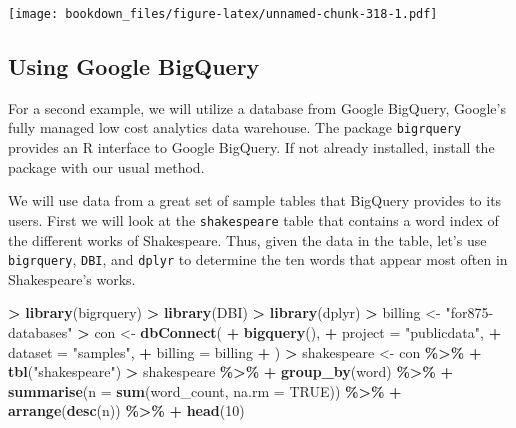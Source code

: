 \documentclass[
]{krantz}
\makeatletter
\newenvironment{Shaded}{\begin{snugshade}}{\end{snugshade}}
\newcommand{\DataTypeTok}[1]{\textcolor[rgb]{0.27,0.27,0.27}{#1}}
\newcommand{\DecValTok}[1]{\textcolor[rgb]{0.06,0.06,0.06}{#1}}
\newcommand{\KeywordTok}[1]{\textcolor[rgb]{0.27,0.27,0.27}{\textbf{#1}}}
\newcommand{\NormalTok}[1]{#1}
\newcommand{\OperatorTok}[1]{\textcolor[rgb]{0.43,0.43,0.43}{\textbf{#1}}}
\newcommand{\OtherTok}[1]{\textcolor[rgb]{0.37,0.37,0.37}{#1}}
\newcommand{\StringTok}[1]{\textcolor[rgb]{0.5,0.5,0.5}{#1}}
\newenvironment{kframe}{%
\medskip{}
\setlength{\fboxsep}{.8em}
 \def\at@end@of@kframe{}%
 \ifinner\ifhmode%
  \def\at@end@of@kframe{\end{minipage}}%
  \begin{minipage}{\columnwidth}%
 \fi\fi%
 \def\FrameCommand##1{\hskip\@totalleftmargin \hskip-\fboxsep
 \colorbox{shadecolor}{##1}\hskip-\fboxsep
     \hskip-\linewidth \hskip-\@totalleftmargin \hskip\columnwidth}%
 \MakeFramed {\advance\hsize-\width
   \@totalleftmargin\z@ \linewidth\hsize
   \@setminipage}}%
 {\par\unskip\endMakeFramed%
 \at@end@of@kframe}
\renewenvironment{Shaded}{\begin{kframe}}{\end{kframe}}
\makeatother
\begin{document}
\texttt{[image: bookdown\_files/figure-latex/unnamed-chunk-318-1.pdf]}

\hypertarget{using-google-bigquery}{%
\subsection{Using Google BigQuery}\label{using-google-bigquery}}

For a second example, we will utilize a database from Google BigQuery, Google's fully managed low cost analytics data warehouse. The package \texttt{bigrquery} provides an R interface to Google BigQuery. If not already installed, install the package with our usual method.

We will use data from a great set of sample tables that BigQuery provides to its users. First we will look at the \texttt{shakespeare} table that contains a word index of the different works of Shakespeare. Thus, given the data in the table, let's use \texttt{bigrquery}, \texttt{DBI}, and \texttt{dplyr} to determine the ten words that appear most often in Shakespeare's works.

\begin{Shaded}
\begin{Highlighting}[]
\OperatorTok{\textgreater{}}\StringTok{ }\KeywordTok{library}\NormalTok{(bigrquery)}
\OperatorTok{\textgreater{}}\StringTok{ }\KeywordTok{library}\NormalTok{(DBI)}
\OperatorTok{\textgreater{}}\StringTok{ }\KeywordTok{library}\NormalTok{(dplyr)}
\OperatorTok{\textgreater{}}\StringTok{ }\NormalTok{billing \textless{}{-}}\StringTok{ "for875{-}databases"}
\OperatorTok{\textgreater{}}\StringTok{ }\NormalTok{con \textless{}{-}}\StringTok{ }\KeywordTok{dbConnect}\NormalTok{(}
\OperatorTok{+}\StringTok{   }\KeywordTok{bigquery}\NormalTok{(),}
\OperatorTok{+}\StringTok{   }\DataTypeTok{project =} \StringTok{"publicdata"}\NormalTok{,}
\OperatorTok{+}\StringTok{   }\DataTypeTok{dataset =} \StringTok{"samples"}\NormalTok{,}
\OperatorTok{+}\StringTok{   }\DataTypeTok{billing =}\NormalTok{ billing}
\OperatorTok{+}\StringTok{ }\NormalTok{)}
\OperatorTok{\textgreater{}}\StringTok{ }\NormalTok{shakespeare \textless{}{-}}\StringTok{ }\NormalTok{con }\OperatorTok{\%\textgreater{}\%}
\OperatorTok{+}\StringTok{   }\KeywordTok{tbl}\NormalTok{(}\StringTok{"shakespeare"}\NormalTok{)}
\OperatorTok{\textgreater{}}\StringTok{ }\NormalTok{shakespeare }\OperatorTok{\%\textgreater{}\%}
\OperatorTok{+}\StringTok{   }\KeywordTok{group\_by}\NormalTok{(word) }\OperatorTok{\%\textgreater{}\%}
\OperatorTok{+}\StringTok{   }\KeywordTok{summarise}\NormalTok{(}\DataTypeTok{n =} \KeywordTok{sum}\NormalTok{(word\_count, }\DataTypeTok{na.rm =} \OtherTok{TRUE}\NormalTok{)) }\OperatorTok{\%\textgreater{}\%}
\OperatorTok{+}\StringTok{   }\KeywordTok{arrange}\NormalTok{(}\KeywordTok{desc}\NormalTok{(n)) }\OperatorTok{\%\textgreater{}\%}
\OperatorTok{+}\StringTok{   }\KeywordTok{head}\NormalTok{(}\DecValTok{10}\NormalTok{)}
\end{Highlighting}
\end{Shaded}
\end{document}
